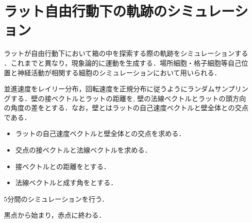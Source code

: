 \section{ラット自由行動下の軌跡のシミュレーション}
ラットが自由行動下において箱の中を探索する際の軌跡をシミュレーションする \cite{Raudies2012-gp}．これまでと異なり，現象論的に運動を生成する．場所細胞・格子細胞等自己位置と神経活動が相関する細胞のシミュレーションにおいて用いられる．


並進速度をレイリー分布，回転速度を正規分布に従うようにランダムサンプリングする．壁の接ベクトルとラットの距離を, 壁の法線ベクトルとラットの頭方向の角度の差をとする．なお，壁とはラットの自己速度ベクトルと壁全体との交点である．

\begin{itemize}
\item ラットの自己速度ベクトルと壁全体との交点を求める．
\item 交点の接ベクトルと法線ベクトルを求める．
\item 接ベクトルとの距離をとする．
\item 法線ベクトルと成す角をとする．
\end{itemize}


5分間のシミュレーションを行う．

黒点から始まり，赤点に終わる．


